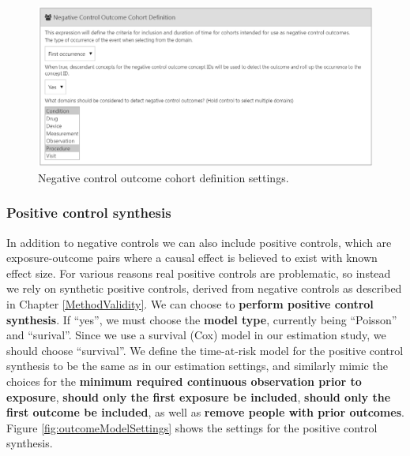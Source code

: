 \documentclass[11pt]{book}
\theoremstyle{definition}
\theoremstyle{definition}
\theoremstyle{definition}
\theoremstyle{remark}
\begin{document}
\begin{figure}

{\centering \includegraphics[width=1\linewidth]{images/PopulationLevelEstimation/ncSettings} 

}

\caption{Negative control outcome cohort definition settings.}\label{fig:ncSettings}
\end{figure}

\hypertarget{positive-control-synthesis}{%
\subsubsection*{Positive control synthesis}\label{positive-control-synthesis}}

In addition to negative controls we can also include positive controls, which are exposure-outcome pairs where a causal effect is believed to exist with known effect size. For various reasons real positive controls are problematic, so instead we rely on synthetic positive controls, derived from negative controls as described in Chapter \ref{MethodValidity}. We can choose to \textbf{perform positive control synthesis}. If ``yes'', we must choose the \textbf{model type}, currently being ``Poisson'' and ``surival''. Since we use a survival (Cox) model in our estimation study, we should choose ``survival''. We define the time-at-risk model for the positive control synthesis to be the same as in our estimation settings, and similarly mimic the choices for the \textbf{minimum required continuous observation prior to exposure}, \textbf{should only the first exposure be included}, \textbf{should only the first outcome be included}, as well as \textbf{remove people with prior outcomes}. Figure \ref{fig:outcomeModelSettings} shows the settings for the positive control synthesis.
\end{document}
